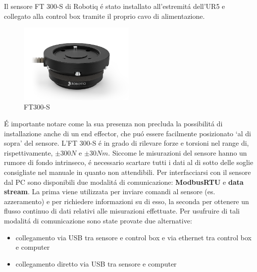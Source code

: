 Il sensore FT 300-S di Robotiq \'{e} stato installato all'estremit\'{a} dell'UR5 e collegato alla control box tramite il proprio 
cavo di alimentazione. 
\begin{figure}[H]
    \centering
    \includegraphics*[width=0.5\textwidth]{images/ft.png}
    \caption{FT300-S}
    \label{fig:ft}
\end{figure}
\'{E} importante notare come la sua presenza non precluda la possibilit\'{a} di installazione anche di un end effector, 
che pu\'{o} essere facilmente posizionato `al di sopra' del sensore. 
L'FT 300-S \'{e} in grado di rilevare forze e torsioni nel range di, rispettivamente, $\pm 300 N$ e $\pm 30 Nm$. 
Siccome le misurazioni del sensore hanno un rumore di fondo intrinseco, \'{e} necessario scartare tutti i dati al di sotto delle 
soglie consigliate nel manuale \cite{ft_sensor} in quanto non attendibili. 
Per interfacciarsi con il sensore dal PC sono disponibili due modalit\'{a} di comunicazione: \textbf{ModbusRTU} e \textbf{data stream}. 
La prima viene utilizzata per inviare comandi al sensore (es. azzeramento) e per richiedere informazioni su di esso, la seconda 
per ottenere un flusso continuo di dati relativi alle misurazioni effettuate. 
Per usufruire di tali modalit\'{a} di comunicazione sono state provate due alternative: 
\begin{itemize}
    \item collegamento via USB tra sensore e control box e via ethernet tra control box e computer
    \item collegamento diretto via USB tra sensore e computer
\end{itemize}

